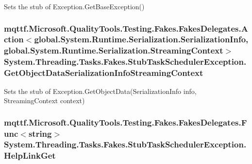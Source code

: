 Sets the stub of Exception.\-Get\-Base\-Exception()

\hypertarget{class_system_1_1_threading_1_1_tasks_1_1_fakes_1_1_stub_task_scheduler_exception_a7524671b8f879a6a1d0908e95515d447}{
\subsubsection[{Get\-Object\-Data\-Serialization\-Info\-Streaming\-Context}]{\setlength{\rightskip}{0pt plus 5cm}mqttf.\-Microsoft.\-Quality\-Tools.\-Testing.\-Fakes.\-Fakes\-Delegates.\-Action$<$global.\-System.\-Runtime.\-Serialization.\-Serialization\-Info, global.\-System.\-Runtime.\-Serialization.\-Streaming\-Context$>$ System.\-Threading.\-Tasks.\-Fakes.\-Stub\-Task\-Scheduler\-Exception.\-Get\-Object\-Data\-Serialization\-Info\-Streaming\-Context}}\label{class_system_1_1_threading_1_1_tasks_1_1_fakes_1_1_stub_task_scheduler_exception_a7524671b8f879a6a1d0908e95515d447}


Sets the stub of Exception.\-Get\-Object\-Data(\-Serialization\-Info info, Streaming\-Context context)

\hypertarget{class_system_1_1_threading_1_1_tasks_1_1_fakes_1_1_stub_task_scheduler_exception_a2d5de30531d32963b6071e38f08a6163}{
\subsubsection[{Help\-Link\-Get}]{\setlength{\rightskip}{0pt plus 5cm}mqttf.\-Microsoft.\-Quality\-Tools.\-Testing.\-Fakes.\-Fakes\-Delegates.\-Func$<$string$>$ System.\-Threading.\-Tasks.\-Fakes.\-Stub\-Task\-Scheduler\-Exception.\-Help\-Link\-Get}}\label{class_system_1_1_threading_1_1_tasks_1_1_fakes_1_1_stub_task_scheduler_exception_a2d5de30531d32963b6071e38f08a6163}


